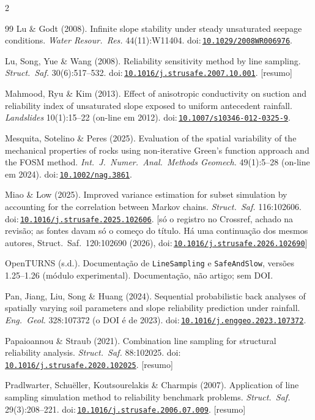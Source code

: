 \documentclass[11pt,a4paper]{article}
\newcommand{\doi}[1]{doi:\,\href{https://doi.org/#1}{\nolinkurl{#1}}}
\begin{document}
\begin{multicols}{2}
\begin{thebibliography}{99}
 Lu \& Godt (2008). Infinite slope stability under steady unsaturated seepage
conditions. \emph{Water Resour.\ Res.} 44(11):W11404. \doi{10.1029/2008WR006976}.

 Lu, Song, Yue \& Wang (2008). Reliability sensitivity method by line sampling.
\emph{Struct.\ Saf.} 30(6):517--532. \doi{10.1016/j.strusafe.2007.10.001}. [resumo]

 Mahmood, Ryu \& Kim (2013). Effect of anisotropic conductivity on suction and
reliability index of unsaturated slope exposed to uniform antecedent rainfall. \emph{Landslides} 10(1):15--22 (on-line
em 2012). \doi{10.1007/s10346-012-0325-9}.

 Mesquita, Sotelino \& Peres (2025). Evaluation of the spatial variability
of the mechanical properties of rocks using non-iterative Green's function approach and the FOSM method. \emph{Int.\ J.\
Numer.\ Anal.\ Methods Geomech.} 49(1):5--28 (on-line em 2024). \doi{10.1002/nag.3861}.

 Miao \& Low (2025). Improved variance estimation for subset simulation by
accounting for the correlation between Markov chains. \emph{Struct.\ Saf.} 116:102606.
\doi{10.1016/j.strusafe.2025.102606}. [só o registro no Crossref, achado na revisão; as fontes davam só o começo do
título. Há uma continuação dos mesmos autores, Struct.\ Saf.\ 120:102690 (2026), \doi{10.1016/j.strusafe.2026.102690}]

 OpenTURNS (s.d.). Documentação de \texttt{LineSampling} e \texttt{SafeAndSlow},
versões 1.25--1.26 (módulo experimental). Documentação, não artigo; sem DOI.

 Pan, Jiang, Liu, Song \& Huang (2024). Sequential probabilistic back analyses of
spatially varying soil parameters and slope reliability prediction under rainfall. \emph{Eng.\ Geol.} 328:107372 (o
DOI é de 2023). \doi{10.1016/j.enggeo.2023.107372}.

 Papaioannou \& Straub (2021). Combination line sampling for
structural reliability analysis. \emph{Struct.\ Saf.} 88:102025. \doi{10.1016/j.strusafe.2020.102025}. [resumo]

 Pradlwarter, Schuëller, Koutsourelakis \& Charmpis (2007).
Application of line sampling simulation method to reliability benchmark problems. \emph{Struct.\ Saf.} 29(3):208--221.
\doi{10.1016/j.strusafe.2006.07.009}. [resumo]


\end{thebibliography}
\end{multicols}
\end{document}
